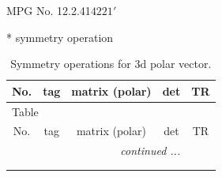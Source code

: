 \documentclass[fleqn,8pt]{jsarticle}
\begin{document}
\setcounter{MaxMatrixCols}{32}

\renewcommand{\tablename}{Table~}
\renewcommand{\figurename}{Figure~}
\begin{center}
\LARGE
MPG No. 12.2.41\quad$4221'$
\end{center}
* symmetry operation
\renewcommand{\arraystretch}{1.3}
\begin{longtable}{ccccc}
\caption{Symmetry operations for 3d polar vector.}
 \\
 \hline \hline
No. & tag & matrix (polar) & det & TR \\ \hline \endfirsthead

\multicolumn{4}{l}{\tablename\ \thetable{}} \\
 \hline \hline
No. & tag & matrix (polar) & det & TR \\ \hline \endhead

 \hline \hline
\multicolumn{4}{r}{\footnotesize\it continued ...} \\ \endfoot

 \hline \hline
\multicolumn{4}{r}{} \\ \endlastfoot


\end{longtable}
\end{document}
